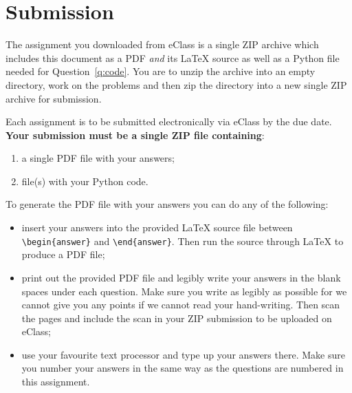 \documentclass{article}
\begin{document}
\clearpage

\section*{Submission}
The assignment you downloaded from eClass is a single ZIP archive which includes this document as a PDF {\em and} its \LaTeX{} source as well as a Python file needed for Question~\ref{q:code}.
You are to unzip the archive into an empty directory, work on the problems and then zip the directory into a new single ZIP archive for submission.

\medskip

Each assignment is to be submitted electronically via eClass by the due date.
\textbf{Your submission must be a single ZIP file containing}:
\begin{enumerate}
\item a single PDF file with your answers;
\item file(s) with your Python code.
\end{enumerate}

To generate the PDF file with your answers you can do any of the following:

\begin{itemize}
\item
insert your answers into the provided \LaTeX{} source file between \verb|\begin{answer}| and \verb|\end{answer}|. Then run the source through \LaTeX{} to produce a PDF file;

\item print out the provided PDF file and legibly write your answers in the blank spaces under each question. Make sure you write as legibly as possible for we cannot give you any points if we cannot read your hand-writing. Then scan the pages and include the scan in your ZIP submission to be uploaded on eClass;

\item use your favourite text processor and type up your answers there. Make sure you number your answers in the same way as the questions are numbered in this assignment.
\end{itemize}
\end{document}
